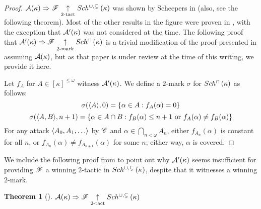 \documentclass{rmmcart}
\theoremstyle{plain}
\newtheorem{theorem}{Theorem}
\theoremstyle{definition}
\theoremstyle{remark}
\theoremstyle{plain}
\theoremstyle{definition}
\theoremstyle{remark}
\begin{document}
  \begin{proof}
    \(\mathcal{A}(\kappa)\Rightarrow\mathscr{F} \underset{2\text{-tact}}{\uparrow}Sch^{\cup,\subsetneq}\left({\kappa}\right)\) was
    shown by Scheepers in \cite{MR1129143} (also, see the following theorem).
    Most of the other results in the figure were proven
    in \cite{clontzMengerGamePreprint}, with the exception that
    \(\mathcal{A}'(\kappa)\) was not considered at the time.
    The following proof that
    \(\mathcal{A}'(\kappa)\Rightarrow\mathscr{F} \underset{2\text{-mark}}{\uparrow}Sch^{\cap}\left({\kappa}\right)\)
    is a trivial modification of the proof presented in
    \cite{clontzMengerGamePreprint} assuming \(\mathcal{A}(\kappa)\), but as
    that paper is under review at the time
    of this writing, we provide it here.

    Let \(f_A\) for \(A\in[\kappa]^{\leq\omega}\) witness \(\mathcal{A}'(\kappa)\).
    We define a \(2\)-mark \(\sigma\) for \(Sch^{\cap}\left({\kappa}\right)\) as follows:
      \[
        \sigma(\langle A\rangle,0) = \{\alpha\in A: f_A(\alpha) = 0 \}
      \]
      \[
        \sigma(\langle A,B\rangle,n+1)
          =
        \{
          \alpha \in A\cap B
        :
          f_B(\alpha) \leq n+1 \text{ or }
          f_A(\alpha)\not=f_B(\alpha)
        \}
      \]
    For any attack \(\<A_0,A_1,\dots\>\) by \(\mathscr{C}\) and
    \(\alpha\in\bigcap_{n<\omega}A_n\), either \(f_{A_n}(\alpha)\) is constant for
    all \(n\), or \(f_{A_n}(\alpha)\not=f_{A_{n+1}}(\alpha)\) for some \(n\);
    either way, \(\alpha\) is covered.
  \end{proof}

  We include the following proof from \cite{MR1129143} to point
  out why \(\mathcal{A}'(\kappa)\) seems insufficient for providing \(\mathscr{F}\) a
  winning \(2\)-tactic in \(Sch^{\cup,\subsetneq}\left({\kappa}\right)\), despite that it
  witnesses a winning \(2\)-mark.

  \begin{theorem}[\cite{MR1129143}]
    \(\mathcal{A}(\kappa)\Rightarrow\mathscr{F} \underset{2\text{-tact}}{\uparrow}Sch^{\cup,\subsetneq}\left({\kappa}\right)\)
  \end{theorem}
\end{document}
